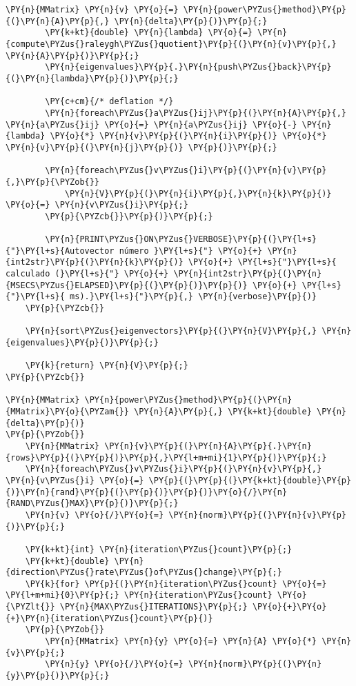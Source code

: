 \begin{Verbatim}[commandchars=\\\{\}]
		\PY{n}{MMatrix} \PY{n}{v} \PY{o}{=} \PY{n}{power\PYZus{}method}\PY{p}{(}\PY{n}{A}\PY{p}{,} \PY{n}{delta}\PY{p}{)}\PY{p}{;}
		\PY{k+kt}{double} \PY{n}{lambda} \PY{o}{=} \PY{n}{compute\PYZus{}raleygh\PYZus{}quotient}\PY{p}{(}\PY{n}{v}\PY{p}{,} \PY{n}{A}\PY{p}{)}\PY{p}{;}
		\PY{n}{eigenvalues}\PY{p}{.}\PY{n}{push\PYZus{}back}\PY{p}{(}\PY{n}{lambda}\PY{p}{)}\PY{p}{;}

		\PY{c+cm}{/* deflation */}
		\PY{n}{foreach\PYZus{}a\PYZus{}ij}\PY{p}{(}\PY{n}{A}\PY{p}{,} \PY{n}{a\PYZus{}ij} \PY{o}{=} \PY{n}{a\PYZus{}ij} \PY{o}{-} \PY{n}{lambda} \PY{o}{*} \PY{n}{v}\PY{p}{(}\PY{n}{i}\PY{p}{)} \PY{o}{*} \PY{n}{v}\PY{p}{(}\PY{n}{j}\PY{p}{)} \PY{p}{)}\PY{p}{;}

		\PY{n}{foreach\PYZus{}v\PYZus{}i}\PY{p}{(}\PY{n}{v}\PY{p}{,}\PY{p}{\PYZob{}}
			\PY{n}{V}\PY{p}{(}\PY{n}{i}\PY{p}{,}\PY{n}{k}\PY{p}{)} \PY{o}{=} \PY{n}{v\PYZus{}i}\PY{p}{;}
		\PY{p}{\PYZcb{}}\PY{p}{)}\PY{p}{;}

		\PY{n}{PRINT\PYZus{}ON\PYZus{}VERBOSE}\PY{p}{(}\PY{l+s}{"}\PY{l+s}{Autovector número }\PY{l+s}{"} \PY{o}{+} \PY{n}{int2str}\PY{p}{(}\PY{n}{k}\PY{p}{)} \PY{o}{+} \PY{l+s}{"}\PY{l+s}{ calculado (}\PY{l+s}{"} \PY{o}{+} \PY{n}{int2str}\PY{p}{(}\PY{n}{MSECS\PYZus{}ELAPSED}\PY{p}{(}\PY{p}{)}\PY{p}{)} \PY{o}{+} \PY{l+s}{"}\PY{l+s}{ ms).}\PY{l+s}{"}\PY{p}{,} \PY{n}{verbose}\PY{p}{)}
	\PY{p}{\PYZcb{}}

	\PY{n}{sort\PYZus{}eigenvectors}\PY{p}{(}\PY{n}{V}\PY{p}{,} \PY{n}{eigenvalues}\PY{p}{)}\PY{p}{;}

	\PY{k}{return} \PY{n}{V}\PY{p}{;}
\PY{p}{\PYZcb{}}

\PY{n}{MMatrix} \PY{n}{power\PYZus{}method}\PY{p}{(}\PY{n}{MMatrix}\PY{o}{\PYZam{}} \PY{n}{A}\PY{p}{,} \PY{k+kt}{double} \PY{n}{delta}\PY{p}{)}
\PY{p}{\PYZob{}}
	\PY{n}{MMatrix} \PY{n}{v}\PY{p}{(}\PY{n}{A}\PY{p}{.}\PY{n}{rows}\PY{p}{(}\PY{p}{)}\PY{p}{,}\PY{l+m+mi}{1}\PY{p}{)}\PY{p}{;}
	\PY{n}{foreach\PYZus{}v\PYZus{}i}\PY{p}{(}\PY{n}{v}\PY{p}{,} \PY{n}{v\PYZus{}i} \PY{o}{=} \PY{p}{(}\PY{p}{(}\PY{k+kt}{double}\PY{p}{)}\PY{n}{rand}\PY{p}{(}\PY{p}{)}\PY{p}{)}\PY{o}{/}\PY{n}{RAND\PYZus{}MAX}\PY{p}{)}\PY{p}{;}
	\PY{n}{v} \PY{o}{/}\PY{o}{=} \PY{n}{norm}\PY{p}{(}\PY{n}{v}\PY{p}{)}\PY{p}{;}

	\PY{k+kt}{int} \PY{n}{iteration\PYZus{}count}\PY{p}{;}
	\PY{k+kt}{double} \PY{n}{direction\PYZus{}rate\PYZus{}of\PYZus{}change}\PY{p}{;}
	\PY{k}{for} \PY{p}{(}\PY{n}{iteration\PYZus{}count} \PY{o}{=} \PY{l+m+mi}{0}\PY{p}{;} \PY{n}{iteration\PYZus{}count} \PY{o}{\PYZlt{}} \PY{n}{MAX\PYZus{}ITERATIONS}\PY{p}{;} \PY{o}{+}\PY{o}{+}\PY{n}{iteration\PYZus{}count}\PY{p}{)}
	\PY{p}{\PYZob{}}
		\PY{n}{MMatrix} \PY{n}{y} \PY{o}{=} \PY{n}{A} \PY{o}{*} \PY{n}{v}\PY{p}{;}
		\PY{n}{y} \PY{o}{/}\PY{o}{=} \PY{n}{norm}\PY{p}{(}\PY{n}{y}\PY{p}{)}\PY{p}{;}


\end{Verbatim}
